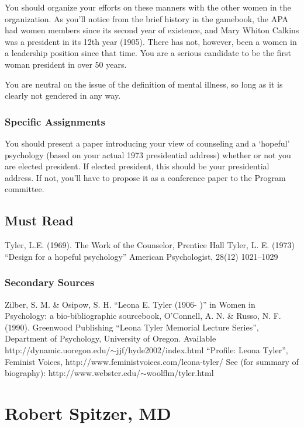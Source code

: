 You should organize your efforts on these manners with the other women in the organization. As you'll notice from the brief history in the gamebook, the APA had women members since its second year of existence, and Mary Whiton Calkins was a president in its 12th year (1905). There has not, however, been a women in a leadership position since that time. You are a serious candidate to be the first woman president in over 50 years.

You are neutral on the issue of the definition of mental illness, so long as it is clearly not gendered in any way.

\subsection{Specific Assignments}
\label{specificassignments}

You should present a paper introducing your view of counseling and a `hopeful' psychology (based on your actual 1973 presidential address) whether or not you are elected president. If elected president, this should be your presidential address. If not, you'll have to propose it as a conference paper to the Program committee.

\section{Must Read}
\label{mustread}

Tyler, L.E. (1969). The Work of the Counselor, Prentice Hall
Tyler, L. E. (1973) “Design for a hopeful psychology” American Psychologist, 28(12) 1021--1029

\subsection{Secondary Sources}
\label{secondarysources}

Zilber, S. M. \& Osipow, S. H. “Leona E. Tyler (1906- )” in Women in Psychology: a bio-bibliographic sourcebook, O'Connell, A. N. \& Russo, N. F. (1990). Greenwood Publishing
“Leona Tyler Memorial Lecture Series”, Department of Psychology, University of Oregon. Available http:\slash \slash dynamic.uoregon.edu\slash \ensuremath{\sim}jjf\slash hyde2002\slash index.html
“Profile: Leona Tyler”, Feminist Voices, http:\slash \slash www.feministvoices.com\slash leona-tyler\slash 
See (for summary of biography): http:\slash \slash www.webster.edu\slash \ensuremath{\sim}woolflm\slash tyler.html

\chapter{Robert Spitzer, MD}
\label{robertspitzermd}

